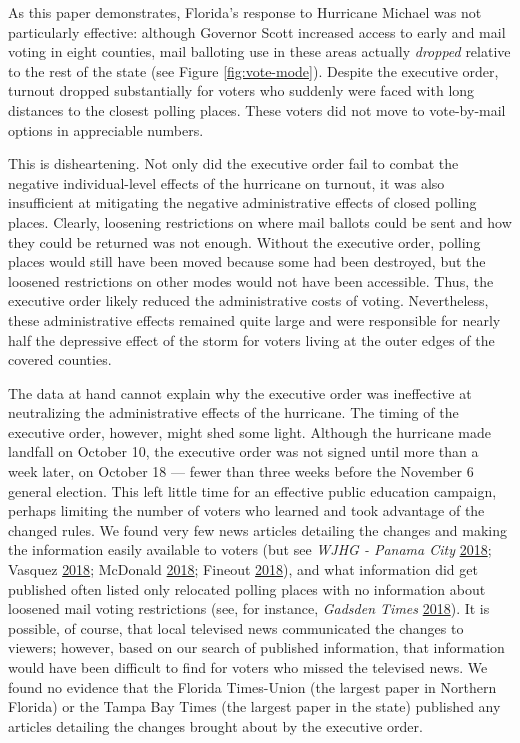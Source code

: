 \documentclass[
  12pt,
]{article}
\begin{document}
As this paper demonstrates, Florida's response to Hurricane Michael was not particularly effective: although Governor Scott increased access to early and mail voting in eight counties, mail balloting use in these areas actually \emph{dropped} relative to the rest of the state (see Figure \ref{fig:vote-mode}). Despite the executive order, turnout dropped substantially for voters who suddenly were faced with long distances to the closest polling places. These voters did not move to vote-by-mail options in appreciable numbers.

This is disheartening. Not only did the executive order fail to combat the negative individual-level effects of the hurricane on turnout, it was also insufficient at mitigating the negative administrative effects of closed polling places. Clearly, loosening restrictions on where mail ballots could be sent and how they could be returned was not enough. Without the executive order, polling places would still have been moved because some had been destroyed, but the loosened restrictions on other modes would not have been accessible. Thus, the executive order likely reduced the administrative costs of voting. Nevertheless, these administrative effects remained quite large and were responsible for nearly half the depressive effect of the storm for voters living at the outer edges of the covered counties.

The data at hand cannot explain why the executive order was ineffective at neutralizing the administrative effects of the hurricane. The timing of the executive order, however, might shed some light. Although the hurricane made landfall on October 10, the executive order was not signed until more than a week later, on October 18 --- fewer than three weeks before the November 6 general election. This left little time for an effective public education campaign, perhaps limiting the number of voters who learned and took advantage of the changed rules. We found very few news articles detailing the changes and making the information easily available to voters (but see \emph{WJHG - Panama City} \protect\hyperlink{ref-WJHG2018}{2018}; Vasquez \protect\hyperlink{ref-Vasquez2018}{2018}; McDonald \protect\hyperlink{ref-McDonald2018}{2018}; Fineout \protect\hyperlink{ref-Fineout2018}{2018}), and what information did get published often listed only relocated polling places with no information about loosened mail voting restrictions (see, for instance, \emph{Gadsden Times} \protect\hyperlink{ref-gadsdentimes2018}{2018}). It is possible, of course, that local televised news communicated the changes to viewers; however, based on our search of published information, that information would have been difficult to find for voters who missed the televised news. We found no evidence that the Florida Times-Union (the largest paper in Northern Florida) or the Tampa Bay Times (the largest paper in the state) published any articles detailing the changes brought about by the executive order.
\end{document}
